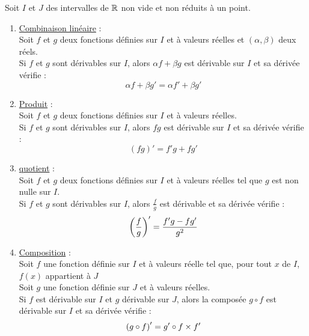 \begin{defprop}
	Soit \(I\) et \(J\) des intervalles de \(\mathbb{R}\) non vide et non réduits à un point. \\
	\begin{enumerate}
		\item \underline{Combinaison linéaire} : \\
		      Soit \(f\) et \(g\) deux fonctions définies sur \(I\) et à valeurs réelles et \((\alpha, \beta)\) deux réels. \\
		      Si \(f\) et \(g\) sont dérivables sur \(I\), alors \(\alpha f + \beta g\) est dérivable sur \(I\) et sa dérivée vérifie :
		      \[\alpha f + \beta g' = \alpha f' + \beta g'\]
		\item \underline{Produit} : \\
		      Soit \(f\) et \(g\) deux fonctions définies sur \(I\) et à valeurs réelles. \\
		      Si \(f\) et \(g\) sont dérivables sur \(I\), alors \(f g\) est dérivable sur \(I\) et sa dérivée vérifie :
		      \[(f g)' =f'g+fg'\]
		      \item\underline{quotient} :\\
		      Soit \(f\) et \(g\) deux fonctions définies sur \(I\) et à valeurs réelles tel que \(g\) est non nulle sur \(I\). \\
		      Si \(f\) et \(g\) sont dérivables sur \(I\), alors \(\frac{f}{g}\) est dérivable et sa dérivée vérifie :
		      \[\left(\frac{f}{g}\right)' = \frac{f'g-fg'}{g^2}\]
		\item \underline{Composition} : \\
		      Soit \(f\) une fonction définie sur \(I\) et à valeurs réelle tel que, pour tout \(x\) de \(I\), \(f(x)\) appartient à \(J\)\\
		      Soit \(g\) une fonction définie sur \(J\) et à valeurs réelles. \\
		      Si \(f\) est dérivable sur \(I\) et \(g\) dérivable sur \(J\), alors la composée \(g \circ f\) est dérivable sur \(I\) et sa dérivée vérifie :
		      \[\left(g \circ f\right)' = g' \circ f \times f'\]
	\end{enumerate}
\end{defprop}

